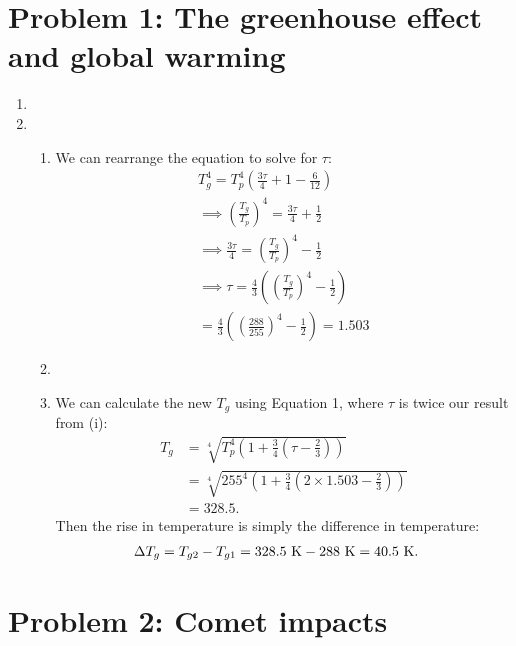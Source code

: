 \documentclass[11pt,letterpaper]{article}
\begin{document}
\section*{Problem 1: The greenhouse effect and global warming}
\begin{enumerate}[label=(\alph*)]
    \item
    \item 
        \begin{enumerate}[label=(\roman*)]
            \item We can rearrange the equation to solve for $\tau$: 
                \begin{align*}
                    T_g^4 = T_p^4\left(\frac{3\tau}{4} + 1 - \frac{6}{12}\right) \\
                    \implies \left(\frac{T_g}{T_p}\right)^4 = \frac{3\tau}{4} + \frac{1}{2} \\
                    \implies \frac{3\tau}{4} = \left(\frac{T_g}{T_p}\right)^4 - \frac{1}{2} \\
                    \implies \tau = \frac{4}{3}\left(\left(\frac{T_g}{T_p}\right)^4 - \frac{1}{2}\right) \\
                    = \frac{4}{3}\left(\left(\frac{288}{255}\right)^4 - \frac{1}{2}\right)
                    = 1.503
                \end{align*}
            \item
            \item We can calculate the new $T_g$ using Equation 1, where $\tau$ is twice our result from (i):
                \begin{align*}
                    T_g &= \sqrt[4]{T_p^4\left(1+\frac{3}{4}\left(\tau - \frac{2}{3}\right)\right)} \\
                    &= \sqrt[4]{255^4 \left(1 + \frac{3}{4}\left(2\times1.503 - \frac{2}{3}\right)\right)} \\
                    &= 328.5.
                \end{align*}
                Then the rise in temperature is simply the difference in temperature: 
                \begin{align*}
                    \Delta T_g &= T_{g2} - T_{g1} = 328.5~{\rm K} - 288~{\rm K} = 40.5~{\rm K}. 
                \end{align*}
        \end{enumerate}
\end{enumerate}

\section*{Problem 2: Comet impacts}
\end{document}
